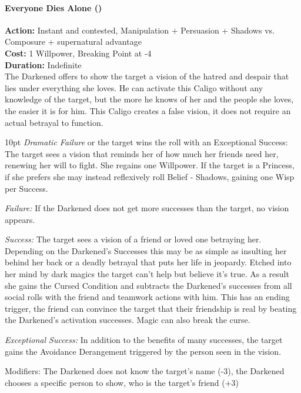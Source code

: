 \paragraph*{Everyone Dies Alone (\textbullet\textbullet\textbullet\textbullet)}

\noindent \textbf{Action:} Instant and contested, Manipulation + Persuasion + Shadows vs. Composure + supernatural advantage\\

\noindent \textbf{Cost:} 1 Willpower, Breaking Point at -4\\

\noindent \textbf{Duration:} Indefinite \\

\noindent The Darkened offers to show the target a vision of the hatred and despair that lies under everything she loves. He can activate this Caligo without any knowledge of the target, but the more he knows of her and the people she loves, the easier it is for him. This Caligo creates a false vision, it does not require an actual betrayal to function.

   \begin{myindentpar}{10pt} \emph{Dramatic Failure} or the target wins the roll with an Exceptional Success: The target sees a vision that reminds her of how much her friends need her, renewing her will to fight. She regains one Willpower. If the target is a Princess, if she prefers she may instead reflexively roll Belief - Shadows, gaining one Wisp per Success.

    \emph{Failure:} If the Darkened does not get more successes than the target, no vision appears.

    \emph{Success:} The target sees a vision of a friend or loved one betraying her. Depending on the Darkened's Successes this may be as simple as insulting her behind her back or a deadly betrayal that puts her life in jeopardy. Etched into her mind by dark magics the target can't help but believe it's true. As a result she gains the Cursed Condition and subtracts the Darkened's successes from all social rolls with the friend and teamwork actions with him. This has an ending trigger, the friend can convince the target that their friendship is real by beating the Darkened's activation successes. Magic can also break the curse. 

    \emph{Exceptional Success:} In addition to the benefits of many successes, the target gains the Avoidance Derangement triggered by the person seen in the vision.

Modifiers: The Darkened does not know the target's name (-3), the Darkened chooses a specific person to show, who is the target's friend (+3) \end{myindentpar}

